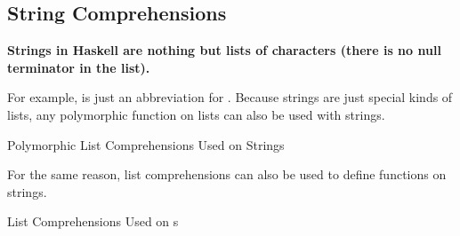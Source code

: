 \subsection{String Comprehensions}\label{subsec:String_Comprehensions}
\begin{blackbox}
  \textbf{Strings in Haskell are nothing but lists of characters (there is no null terminator in the list).}
\end{blackbox}

For example,  is just an abbreviation for \haskellinline{[`a', `b', `c']::[Char]}.
Because strings are just special kinds of lists, any polymorphic function on lists can also be used with strings.
\begin{listing}[h!tbp]
\caption{Polymorphic List Comprehensions Used on Strings}
\label{lst:Polymorphic_List_Comprehensions_Strings}
\end{listing}

For the same reason, list comprehensions can also be used to define functions on strings.
\begin{listing}[h!tbp]
\caption{List Comprehensions Used on s}
\label{lst:String_List_Comprehensions}
\end{listing}

